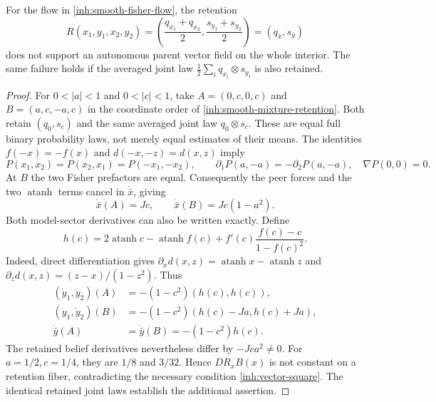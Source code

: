 For the flow in \cref{inh:smooth-fisher-flow}, the retention
\begin{equation}
 R(x_1,y_1,x_2,y_2)
 =\left(\frac{q_{x_1}+q_{x_2}}2,
         \frac{s_{y_1}+s_{y_2}}2\right)
 =(q_{\bar x},s_{\bar y})
 \label{inh:smooth-mixture-retention}
\end{equation}
does not support an autonomous parent vector field on the whole interior.
The same failure holds if the averaged joint law
$\frac12\sum_iq_{x_i}\otimes s_{y_i}$ is also retained.

\begin{proof}
For $0<|a|<1$ and $0<|c|<1$, take
$A=(0,c,0,c)$ and $B=(a,c,-a,c)$ in the coordinate order of
\cref{inh:smooth-mixture-retention}. Both retain $(q_0,s_c)$ and the
same averaged joint law $q_0\otimes s_c$. These are equal full binary
probability laws, not merely equal estimates of their means.
The identities $f(-x)=-f(x)$ and $d(-x,-z)=d(x,z)$ imply
\begin{equation}
 P(x_1,x_2)=P(x_2,x_1)=P(-x_1,-x_2),\qquad
 \partial_1P(a,-a)=-\partial_2P(a,-a),\quad
 \nabla P(0,0)=0.
\end{equation}
At $B$ the two Fisher prefactors are equal. Consequently the peer forces
and the two $\operatorname{atanh}$ terms cancel in $\dot{\bar x}$, giving
\begin{equation}
 \dot{\bar x}(A)=Jc,\qquad
 \dot{\bar x}(B)=Jc(1-a^2).
 \label{inh:smooth-mixture-defect}
\end{equation}
Both model-sector derivatives can also be written exactly. Define
\begin{equation}
 h(c)=2\operatorname{atanh}c-\operatorname{atanh}f(c)
       +f'(c)\frac{f(c)-c}{1-f(c)^2}.
\end{equation}
Indeed, direct differentiation gives
$\partial_xd(x,z)=\operatorname{atanh}x-\operatorname{atanh}z$ and
$\partial_zd(x,z)=(z-x)/(1-z^2)$. Thus
\begin{equation}
 \begin{aligned}
 (\dot y_1,\dot y_2)(A)&=-(1-c^2)(h(c),h(c)),\\
 (\dot y_1,\dot y_2)(B)&=-(1-c^2)(h(c)-Ja,h(c)+Ja),\\
 \dot{\bar y}(A)&=\dot{\bar y}(B)=-(1-c^2)h(c).
 \end{aligned}
\end{equation}
The retained belief derivatives nevertheless differ by $-Jca^2\ne0$.
For $a=1/2,c=1/4$, they are $1/8$ and $3/32$.
Hence $DR_x B(x)$ is not constant on a retention fiber, contradicting the
necessary condition \cref{inh:vector-square}. The identical retained
joint laws establish the additional assertion.
\end{proof}

